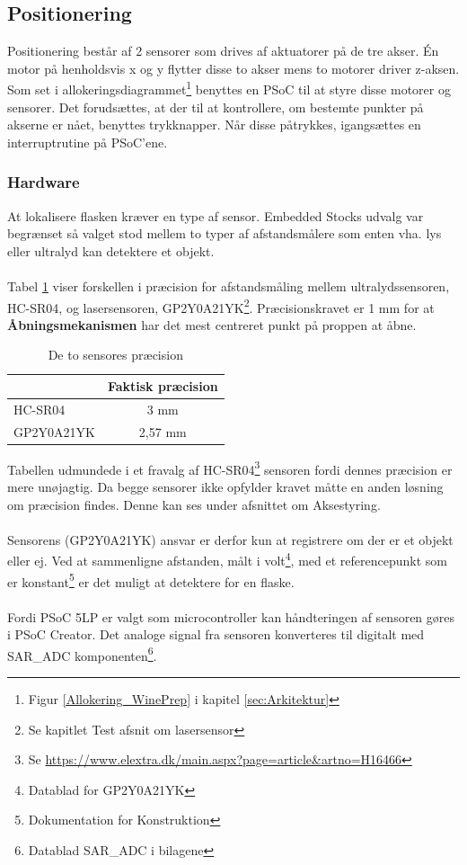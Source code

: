 \subsection{Positionering}
\label{sub:Pos}
Positionering består af 2 sensorer som drives af aktuatorer på de tre akser. Én motor på henholdsvis x og y flytter disse to akser mens to motorer driver z-aksen. \\
Som set i allokeringsdiagrammet\footnote{Figur \ref{Allokering_WinePrep} i kapitel \ref{sec:Arkitektur}} benyttes en PSoC til at styre disse motorer og sensorer. Det forudsættes, at der til at kontrollere, om bestemte punkter på akserne er nået, benyttes trykknapper. Når disse påtrykkes, igangsættes en interruptrutine på PSoC'ene.

\subsubsection{Hardware}
\label{pos_hw}
At lokalisere flasken kræver en type af sensor. Embedded Stocks udvalg var begrænset så valget stod mellem to typer af afstandsmålere som enten vha. lys eller ultralyd kan detektere et objekt.
\\
\\
Tabel \ref{tab:Sensor_precision} viser forskellen i præcision for afstandsmåling mellem ultralydssensoren, HC-SR04, og  lasersensoren, GP2Y0A21YK\footnote{Se kapitlet Test afsnit om lasersensor}. Præcisionskravet er 1 mm for at \textbf{Åbningsmekanismen} har det mest centreret punkt på proppen at åbne.

\begin{table}[H]
	\centering
	\begin{tabular}{ |l|c| }
  		\hline
   		& Faktisk præcision \\
  		\hline 
  		HC-SR04 & 3 mm \\
  		\hline
  		GP2Y0A21YK  & 2,57 mm \\
  		\hline
	\end{tabular}
	\caption{De to sensores præcision}
	\label{tab:Sensor_precision}
\end{table}

\noindent
Tabellen udmundede i et fravalg af HC-SR04\footnote{Se \url{https://www.elextra.dk/main.aspx?page=article&artno=H16466}} sensoren fordi dennes præcision er mere unøjagtig. Da begge sensorer ikke opfylder kravet måtte en anden løsning om præcision findes. Denne kan ses under afsnittet om Aksestyring.
\\
\\
Sensorens (GP2Y0A21YK) ansvar er derfor kun at registrere om der er et objekt eller ej. Ved at sammenligne afstanden, målt i volt\footnote{Datablad for GP2Y0A21YK}, med et referencepunkt som er konstant\footnote{Dokumentation for Konstruktion} er det muligt at detektere for en flaske.
\\
\\
Fordi PSoC 5LP er valgt som microcontroller kan håndteringen af sensoren gøres i PSoC Creator. Det analoge signal fra sensoren konverteres til digitalt med SAR\_ADC komponenten\footnote{Datablad SAR\_ADC i bilagene}.

